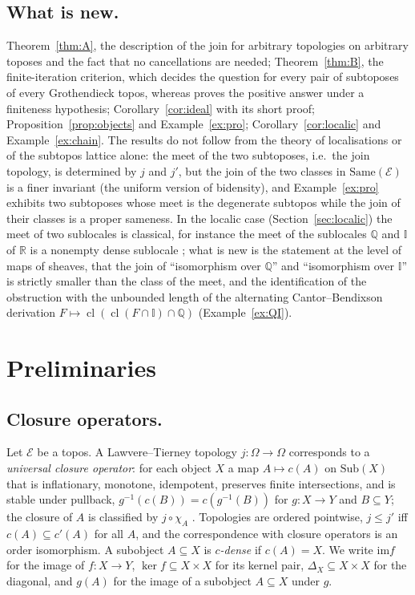 \documentclass[11pt]{amsart}
\theoremstyle{definition}
\newcommand{\Same}{\mathrm{Same}}
\newcommand{\im}{\mathrm{im}}
\newcommand{\Sub}{\mathrm{Sub}}
\newcommand{\cE}{\mathcal E}
\begin{document}
\subsection*{What is new.}
Theorem~\ref{thm:A}, the description of the join for arbitrary topologies
on arbitrary toposes and the fact that no cancellations are needed;
Theorem~\ref{thm:B}, the finite-iteration criterion, which decides the
question for every pair of subtoposes of every Grothendieck topos, whereas
\cite{Finitejoin} proves the positive answer under a finiteness hypothesis;
Corollary~\ref{cor:ideal} with its short proof; Proposition~\ref{prop:objects}
and Example~\ref{ex:pro}; Corollary~\ref{cor:localic} and
Example~\ref{ex:chain}. The results do not follow from the theory of
localisations or of the subtopos lattice alone: the meet of the two
subtoposes, i.e.\ the join topology, is determined by $j$ and $j'$, but the
join of the two classes in $\Same(\cE)$ is a finer invariant (the uniform
version of bidensity), and Example~\ref{ex:pro} exhibits two subtoposes whose
meet is the degenerate subtopos while the join of their classes is a proper
sameness. In the localic case (Section~\ref{sec:localic}) the meet of two
sublocales is classical, for instance the meet of the sublocales $\mathbb Q$
and $\mathbb I$ of $\mathbb R$ is a nonempty dense sublocale
\cite[II.2]{StoneSpaces}; what is new is the statement at the level of
maps of sheaves, that the join of ``isomorphism over $\mathbb Q$'' and
``isomorphism over $\mathbb I$'' is strictly smaller than the class of the
meet, and the identification of the obstruction with the unbounded length
of the alternating Cantor--Bendixson derivation
$F\mapsto\operatorname{cl}(\operatorname{cl}(F\cap\mathbb I)\cap\mathbb Q)$
(Example~\ref{ex:QI}).

\section{Preliminaries}\label{sec:prelim}

\subsection*{Closure operators.}
Let $\cE$ be a topos. A Lawvere--Tierney topology $j\colon\Omega\to\Omega$
corresponds to a \emph{universal closure operator}: for each object $X$ a
map $A\mapsto c(A)$ on $\Sub(X)$ that is inflationary, monotone, idempotent,
preserves finite intersections, and is stable under pullback,
$g^{-1}(c(B))=c(g^{-1}(B))$ for $g\colon X\to Y$ and $B\subseteq Y$; the
closure of $A$ is classified by $j\circ\chi_A$ \cite[V.1]{MLM}. Topologies
are ordered pointwise, $j\le j'$ iff $c(A)\subseteq c'(A)$ for all $A$, and
the correspondence with closure operators is an order isomorphism. A
subobject $A\subseteq X$ is \emph{$c$-dense} if $c(A)=X$. We write $\im f$
for the image of $f\colon X\to Y$, $\ker f\subseteq X\times X$ for its kernel
pair, $\Delta_X\subseteq X\times X$ for the diagonal, and $g(A)$ for the image
of a subobject $A\subseteq X$ under $g$.
\end{document}
